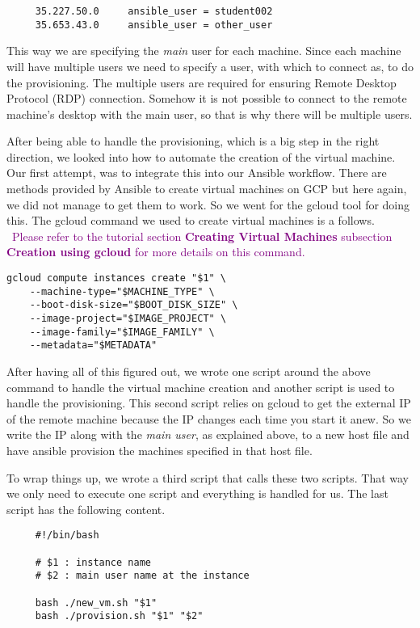 \begin{verbatim}
	 35.227.50.0	 ansible_user = student002
	 35.653.43.0	 ansible_user = other_user
\end{verbatim}

This way we are specifying the \textit{main} user for each machine.
Since each machine will have multiple users we need to specify a user,
with which to connect as, to do the provisioning. The multiple users
are required for ensuring Remote Desktop Protocol (RDP) connection.
Somehow it is not possible to connect to the remote machine's desktop
with the main user, so that is why there will be multiple users.

After being able to handle the provisioning, which is a big step in
the right direction, we looked into how to automate the creation of
the virtual machine. Our first attempt, was to integrate this into our
Ansible workflow. There are methods provided by Ansible to create
virtual machines on GCP but here again, we did not manage to get them
to work. So we went for the gcloud tool for doing this. The gcloud
command we used to create virtual machines is a follows.
\
\textcolor{purple}{Please refer to the tutorial section
\textbf{Creating Virtual Machines} subsection \textbf{Creation using
gcloud} for more details on this command.}

\begin{verbatim}
gcloud compute instances create "$1" \
    --machine-type="$MACHINE_TYPE" \
    --boot-disk-size="$BOOT_DISK_SIZE" \
    --image-project="$IMAGE_PROJECT" \
    --image-family="$IMAGE_FAMILY" \
    --metadata="$METADATA" 
\end{verbatim}

After having all of this figured out, we wrote one script around the
above command to handle the virtual machine creation and another
script is used to handle the provisioning. This second script relies
on gcloud to get the external IP of the remote machine because the IP
changes each time you start it anew. So we write the IP along with the
\textit{main user}, as explained above, to a new host file and have
ansible provision the machines specified in that host file.

To wrap things up, we wrote a third script that calls these two
scripts. That way we only need to execute one script and everything is
handled for us. The last script has the following content.

\begin{verbatim}
	 #!/bin/bash
	 
	 # $1 : instance name
	 # $2 : main user name at the instance
	 
	 bash ./new_vm.sh "$1"
	 bash ./provision.sh "$1" "$2"
\end{verbatim}
